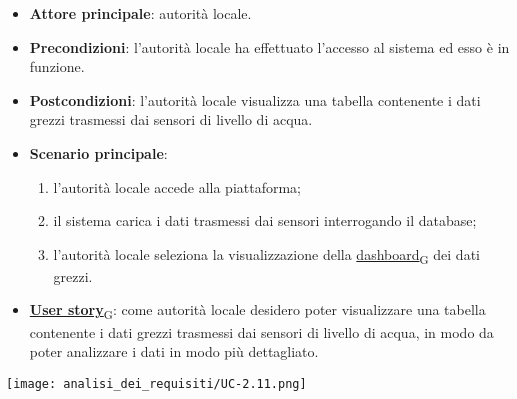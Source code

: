 \begin{itemize}
	\item \textbf{Attore principale}: autorità locale.
	\item \textbf{Precondizioni}: l'autorità locale ha effettuato l'accesso al sistema ed esso è in funzione.
	\item \textbf{Postcondizioni}: l'autorità locale visualizza una tabella contenente i dati grezzi trasmessi dai sensori di livello di acqua.
	\item \textbf{Scenario principale}:
	      \begin{enumerate}
		      \item l'autorità locale accede alla piattaforma;
		      \item il sistema carica i dati trasmessi dai sensori interrogando il database;
		      \item l'autorità locale seleziona la visualizzazione della \href{https://7last.github.io/docs/rtb/documentazione-interna/glossario\#dashboard}{dashboard\textsubscript{G}} dei dati grezzi.
	      \end{enumerate}
	\item \href{https://7last.github.io/docs/rtb/documentazione-interna/glossario\#user-story}{\textbf{User story}\textsubscript{G}}:
	      come autorità locale desidero poter visualizzare una tabella contenente i dati grezzi trasmessi dai sensori di livello di acqua,
	      in modo da poter analizzare i dati in modo più dettagliato.
\end{itemize}
\begin{center}
	\texttt{[image: analisi\_dei\_requisiti/UC-2.11.png]}
\end{center}

\newpage

